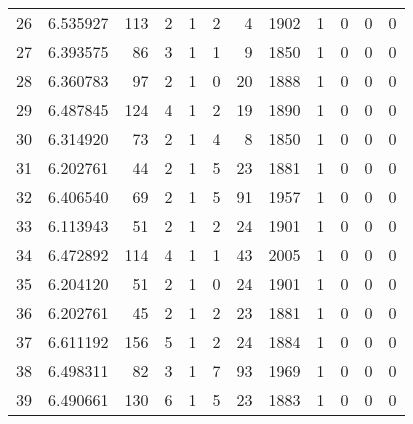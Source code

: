 \begin{tabular}{lrrrrrrrrrrr}
26  &  6.535927 &  113 &      2 &        1 &      2 &               4 &  1902 &               1 &               0 &               0 &               0 \\
27  &  6.393575 &   86 &      3 &        1 &      1 &               9 &  1850 &               1 &               0 &               0 &               0 \\
28  &  6.360783 &   97 &      2 &        1 &      0 &              20 &  1888 &               1 &               0 &               0 &               0 \\
29  &  6.487845 &  124 &      4 &        1 &      2 &              19 &  1890 &               1 &               0 &               0 &               0 \\
30  &  6.314920 &   73 &      2 &        1 &      4 &               8 &  1850 &               1 &               0 &               0 &               0 \\
31  &  6.202761 &   44 &      2 &        1 &      5 &              23 &  1881 &               1 &               0 &               0 &               0 \\
32  &  6.406540 &   69 &      2 &        1 &      5 &              91 &  1957 &               1 &               0 &               0 &               0 \\
33  &  6.113943 &   51 &      2 &        1 &      2 &              24 &  1901 &               1 &               0 &               0 &               0 \\
34  &  6.472892 &  114 &      4 &        1 &      1 &              43 &  2005 &               1 &               0 &               0 &               0 \\
35  &  6.204120 &   51 &      2 &        1 &      0 &              24 &  1901 &               1 &               0 &               0 &               0 \\
36  &  6.202761 &   45 &      2 &        1 &      2 &              23 &  1881 &               1 &               0 &               0 &               0 \\
37  &  6.611192 &  156 &      5 &        1 &      2 &              24 &  1884 &               1 &               0 &               0 &               0 \\
38  &  6.498311 &   82 &      3 &        1 &      7 &              93 &  1969 &               1 &               0 &               0 &               0 \\
39  &  6.490661 &  130 &      6 &        1 &      5 &              23 &  1883 &               1 &               0 &               0 &               0 \\

\end{tabular}
